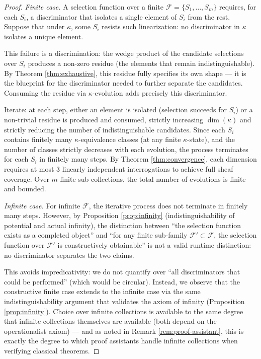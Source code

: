 \begin{proof}
\emph{Finite case.}
A selection function over a finite $\mathcal{F} =
\{S_1, \ldots, S_m\}$ requires, for each $S_i$, a
discriminator that isolates a single element of $S_i$
from the rest. Suppose that under $\kappa$, some $S_i$
resists such linearization: no discriminator in $\kappa$
isolates a unique element.

This failure is a discrimination: the wedge product of
the candidate selections over $S_i$ produces a non-zero
residue (the elements that remain indistinguishable). By
Theorem \ref{thm:exhaustive}, this residue fully specifies
its own shape --- it is the blueprint for the discriminator
needed to further separate the candidates. Consuming the
residue via $\kappa$-evolution adds precisely this
discriminator.

Iterate: at each step, either an element is isolated
(selection succeeds for $S_i$) or a non-trivial residue
is produced and consumed, strictly increasing $\dim(\kappa)$
and strictly reducing the number of indistinguishable
candidates. Since each $S_i$ contains finitely many
$\kappa$-equivalence classes (at any finite $\kappa$-state),
and the number of classes strictly decreases with each
evolution, the process terminates for each $S_i$ in
finitely many steps. By Theorem \ref{thm:convergence},
each dimension requires at most $3$ linearly independent
interrogations to achieve full sheaf coverage. Over $m$
finite sub-collections, the total number of evolutions
is finite and bounded.

\emph{Infinite case.}
For infinite $\mathcal{F}$, the iterative process does
not terminate in finitely many steps. However, by
Proposition \ref{prop:infinity} (indistinguishability of
potential and actual infinity), the distinction between
``the selection function exists as a completed object''
and ``for any finite sub-family $\mathcal{F}' \subset
\mathcal{F}$, the selection function over $\mathcal{F}'$
is constructively obtainable'' is not a valid runtime
distinction: no discriminator separates the two claims.

This avoids impredicativity: we do not quantify over
``all discriminators that could be performed'' (which
would be circular). Instead, we observe that the
constructive finite case extends to the infinite case
via the same indistinguishability argument that validates
the axiom of infinity (Proposition \ref{prop:infinity}).
Choice over infinite collections is available to the same
degree that infinite collections themselves are available
(both depend on the operationalist axiom)
--- and as noted in Remark \ref{rem:proof-assistant},
this is exactly the degree to which proof assistants
handle infinite collections when verifying classical
theorems.
\end{proof}

